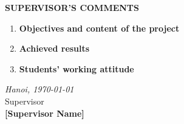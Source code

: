 \newpage
\thispagestyle{empty}
\setcounter{page}{1}

\fontsize{13pt}{16pt}\selectfont
\bigbreak
\begin{center}
	{\bfseries SUPERVISOR'S COMMENTS}
\end{center}
\bigbreak
\fontsize{13pt}{16pt}\selectfont
\bigbreak
\begin{enumerate}
	\item [{\bfseries 1.}]{\bfseries Objectives and content of the project}
            \vspace{5cm}
	\item [{\bfseries 2.}] {\bfseries Achieved results}
            \vspace{5cm}
	\item [{\bfseries 3.}]{\bfseries Students' working attitude}
            \vspace{5cm}
\end{enumerate}
\hspace{0.5\textwidth}
\begin{minipage}{0.5\textwidth}
	\noindent\begin{center}
		\textit{Hanoi, \today} \\
		Supervisor\\ \vspace{2cm}
		\textbf{[Supervisor Name]}
	\end{center}	
\end{minipage}
\restoregeometry
